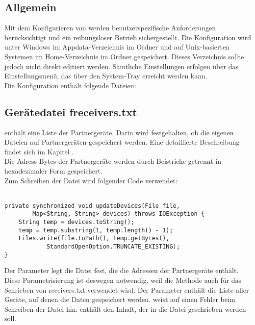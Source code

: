 \subsection{Allgemein}
Mit dem Konfigurieren von \sblit werden benutzerspezifische Anforderungen berücksichtigt und ein reibungsloser Betrieb sichergestellt. Die Konfiguration wird unter Windows im Appdata-Verzeichnis im Ordner  und auf Unix-basierten Systemen im Home-Verzeichnis im Ordner  gespeichert. Dieses Verzeichnis sollte jedoch nicht direkt editiert werden. Sämtliche Einstellungen erfolgen über das Einstellungsmenü, das über den System-Tray erreicht werden kann.\\
Die Konfiguration enthält folgende Dateien:
\subsection{Gerätedatei freceivers.txt}
 enthält eine Liste der Partnergeräte. Darin wird festgehalten, ob die eigenen Dateien auf Partnergeräten  gespeichert werden. Eine detaillierte Beschreibung findet sich im Kapitel . \\
Die Adress-Bytes der Partnergeräte werden durch Beistriche getrennt in hexadezimaler Form gespeichert. \\ %
Zum Schreiben der Datei wird folgender Code verwendet: \\  \\
\javalisting
\begin{minipage}{\linewidth}
\begin{lstlisting}[caption={Schreiben der Gerätedatei freceivers.txt},captionpos=b]
private synchronized void updateDevices(File file,
		Map<String, String> devices) throws IOException {
	String temp = devices.toString();
	temp = temp.substring(1, temp.length() - 1);
	Files.write(file.toPath(), temp.getBytes(),
			StandardOpenOption.TRUNCATE_EXISTING);
}
\end{lstlisting}
\end{minipage}
\begin{description}
	Der Parameter  legt die Datei fest, die die Adressen der Partnergeräte enthält. Diese Parametrisierung ist deswegen notwendig, weil die Methode  auch für das Schrieben von receivers.txt  verwendet wird.
	Der Parameter  enthält die Liste aller Geräte, auf denen die Daten gespeichert werden.
	 weist auf einen Fehler beim Schreiben der Datei hin.
	 enthält den Inhalt, der in die Datei geschrieben werden soll. 
\end{description}
